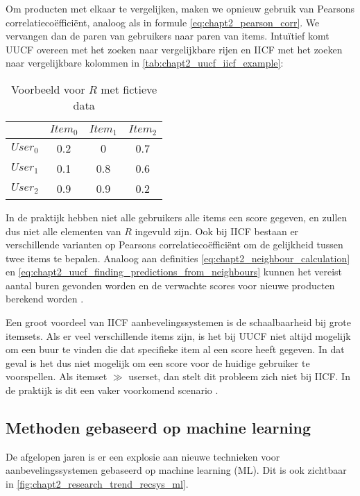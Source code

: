 Om producten met elkaar te vergelijken, maken we opnieuw gebruik van Pearsons correlatiecoëfficiënt, analoog als in formule \ref{eq:chapt2_pearson_corr}. We vervangen dan de paren van gebruikers naar paren van items.
Intuïtief komt UUCF overeen met het zoeken naar vergelijkbare rijen en IICF met het zoeken naar vergelijkbare kolommen in \autoref{tab:chapt2_uucf_iicf_example}:

\begin{table}[H]
\centering
\begin{tabular}{c|ccc}
         & $Item_0$ & $Item_1$ & $Item_2$ \\ \hline
$User_0$ & 0.2      & 0        & 0.7      \\
$User_1$ & 0.1      & 0.8      & 0.6      \\
$User_2$ & 0.9      & 0.9      & 0.2     
\end{tabular}
\caption{Voorbeeld voor $R$ met fictieve data}
\label{tab:chapt2_uucf_iicf_example}
\end{table}

In de praktijk hebben niet alle gebruikers alle items een score gegeven, en zullen dus niet alle elementen van $R$ ingevuld zijn. Ook bij IICF bestaan er verschillende varianten op Pearsons correlatiecoëfficiënt om de gelijkheid tussen twee items te bepalen. Analoog aan definities \ref{eq:chapt2_neighbour_calculation} en \ref{eq:chapt2_uucf_finding_predictions_from_neighbours} kunnen het vereist aantal buren gevonden worden en de verwachte scores voor nieuwe producten berekend worden \cite{IICF_original_paper}.

Een groot voordeel van IICF aanbevelingssystemen is de schaalbaarheid bij grote itemsets. Als er veel verschillende items zijn, is het bij UUCF niet altijd mogelijk om een buur te vinden die dat specifieke item al een score heeft gegeven. In dat geval is het dus niet mogelijk om een score voor de huidige gebruiker te voorspellen. Als itemset $\gg$ userset, dan stelt dit probleem zich niet bij IICF. In de praktijk is dit een vaker voorkomend scenario \cite{recsys_handbook}.

\subsection{Methoden gebaseerd op machine learning}
\label{sec:chapt2_machine_learning_modellen}
De afgelopen jaren is er een explosie aan nieuwe technieken voor aanbevelingssystemen gebaseerd op machine learning (ML). Dit is ook zichtbaar in \autoref{fig:chapt2_research_trend_recsys_ml}.

